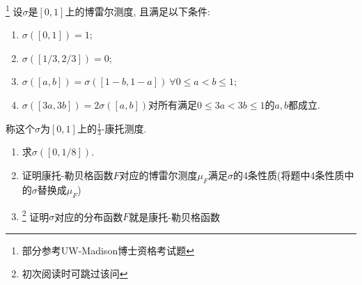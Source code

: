 \begin{example}\label{Cantor_measure}\footnote{部分参考UW-Madison博士资格考试题}
    设$\sigma$是$[0,1]$上的博雷尔测度, 且满足以下条件:
    \begin{enumerate}
    \item $\sigma([0,1]) = 1$;
    \item $\sigma([1/3, 2/3]) = 0$;
    \item $\sigma([a,b]) = \sigma([1-b,1-a])~\forall 0 \leq a < b \leq 1$;
    \item $\sigma([3a, 3b]) = 2\sigma([a,b])$对所有满足$0 \leq 3a < 3b \leq 1$的$a,b$都成立. 
    \end{enumerate}
    称这个$\sigma$为$[0,1]$上的$\frac{1}{3}$-康托测度. 
    \begin{enumerate}
        \item 求$\sigma([0, 1/8])$.
        \item 证明康托-勒贝格函数$F$对应的博雷尔测度$\mu_F$满足$\sigma$的4条性质(将题中4条性质中的$\sigma$替换成$\mu_F$)
        \item\footnote{初次阅读时可跳过该问} 证明$\sigma$对应的分布函数$F$就是康托-勒贝格函数
    \end{enumerate}
\end{example}
